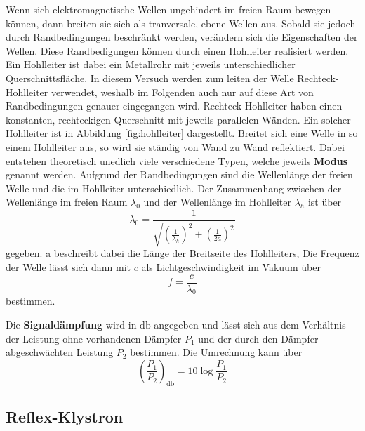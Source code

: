 Wenn sich elektromagnetische Wellen ungehindert im freien Raum bewegen können, dann breiten sie sich als tranversale, ebene Wellen aus. 
Sobald sie jedoch durch Randbedingungen beschränkt werden, verändern sich die Eigenschaften der Wellen. Diese Randbedigungen können durch einen Hohlleiter realisiert werden. Ein Hohlleiter ist dabei ein Metallrohr mit jeweils unterschiedlicher Querschnittsfläche. In diesem Versuch werden zum leiten der Welle Rechteck-Hohlleiter verwendet, weshalb im Folgenden auch nur auf diese Art von Randbedingungen genauer eingegangen wird. Rechteck-Hohlleiter haben einen konstanten, rechteckigen Querschnitt mit jeweils parallelen Wänden. Ein solcher Hohlleiter ist in Abbildung \ref{fig:hohlleiter} dargestellt.
Breitet sich eine Welle in so einem Hohlleiter aus, so wird sie ständig von Wand zu Wand reflektiert. Dabei entstehen theoretisch unedlich viele verschiedene Typen, welche jeweils \textbf{Modus} genannt werden. Aufgrund der Randbedingungen sind die Wellenlänge der freien Welle und die im Hohlleiter unterschiedlich. Der Zusammenhang zwischen der Wellenlänge im freien Raum $\lambda_0$ und der Wellenlänge im Hohlleiter $\lambda_h$ ist über 
\begin{equation}
    \lambda_0 = \frac{1}{\sqrt{\left(\frac{1}{\lambda_h}\right)^2+\left(\frac{1}{2a}\right)^2}}
\end{equation}
gegeben. a beschreibt dabei die Länge der Breitseite des Hohlleiters,
Die Frequenz der Welle lässt sich dann mit $c$ als Lichtgeschwindigkeit im Vakuum über
\begin{equation}
    \label{eqn:f}
    f = \frac{c}{\lambda_0}
\end{equation}
bestimmen.

Die \textbf{Signaldämpfung} wird in $\si{\decibel}$ angegeben und lässt sich aus dem Verhältnis der Leistung ohne vorhandenen Dämpfer $P_1$ und der durch den Dämpfer abgeschwächten Leistung $P_2$ bestimmen.
Die Umrechnung kann über
\begin{equation}
    \left(\frac{P_1}{P_2}\right)_{\si{\decibel}} = 10 \log\frac{P_1}{P_2}
\end{equation}

\subsection{Reflex-Klystron}



